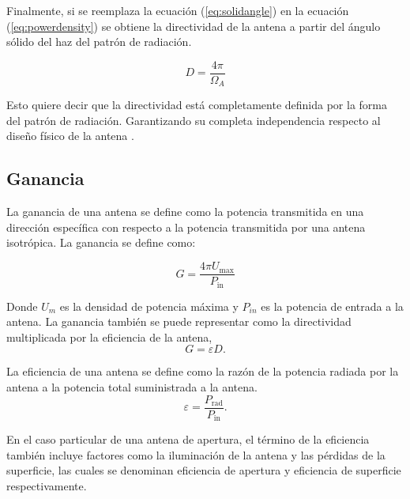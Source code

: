 Finalmente, si se reemplaza la ecuación (\ref{eq:solidangle}) en la ecuación (\ref{eq:powerdensity}) se obtiene la directividad de la antena a partir del ángulo sólido del haz del patrón de radiación.

\begin{equation}
    D = \frac{4\pi}{\Omega_{A}}
\end{equation}

Esto quiere decir que la directividad está completamente definida por la forma del patrón de radiación. Garantizando su completa independencia respecto al diseño físico de la antena \cite{stutzman2012antenna}.\\


\subsection{Ganancia}

La ganancia de una antena se define como la potencia transmitida en una dirección específica con respecto a la potencia transmitida por una antena isotrópica. La ganancia se define como:

\begin{equation}
    G = \frac{4\pi U_{\text{max}}}{P_{\text{in}}}
\end{equation}

Donde $U_{m}$ es la densidad de potencia máxima y $P_{in}$ es la potencia de entrada a la antena. La ganancia también se puede representar como la directividad multiplicada por la eficiencia de la antena,\\

\begin{equation}
    G = \varepsilon D \text{.}
\end{equation}

La eficiencia de una antena se define como la razón de la potencia radiada por la antena a la potencia total suministrada a la antena.\\

\begin{equation}
    \varepsilon = \frac{P_{\text{rad}}}{P_{\text{in}}}\text{.}
\end{equation}

En el caso particular de una antena de apertura, el término de la eficiencia también incluye factores como la iluminación de la antena y las pérdidas de la superficie, las cuales se denominan eficiencia de apertura y eficiencia de superficie respectivamente.\\

